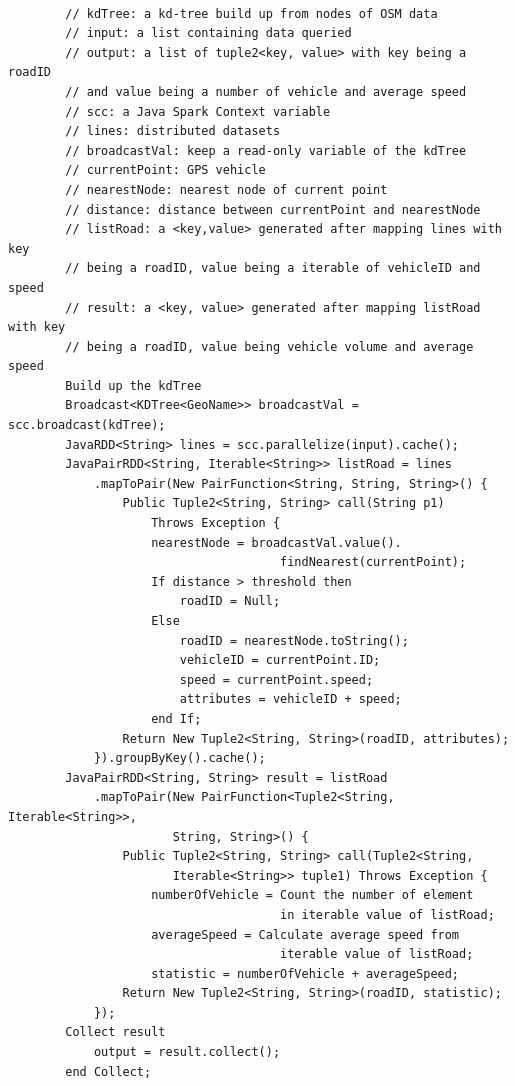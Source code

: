 \documentclass{sig-alternate-05-2015}
\begin{document}
\begin{verbatim}
		
		// kdTree: a kd-tree build up from nodes of OSM data
		// input: a list containing data queried
		// output: a list of tuple2<key, value> with key being a roadID 
		// and value being a number of vehicle and average speed
		// scc: a Java Spark Context variable
		// lines: distributed datasets
		// broadcastVal: keep a read-only variable of the kdTree
		// currentPoint: GPS vehicle 
		// nearestNode: nearest node of current point
		// distance: distance between currentPoint and nearestNode
		// listRoad: a <key,value> generated after mapping lines with key
		// being a roadID, value being a iterable of vehicleID and speed
		// result: a <key, value> generated after mapping listRoad with key 
		// being a roadID, value being vehicle volume and average speed
		Build up the kdTree
		Broadcast<KDTree<GeoName>> broadcastVal = scc.broadcast(kdTree);
		JavaRDD<String> lines = scc.parallelize(input).cache();
		JavaPairRDD<String, Iterable<String>> listRoad = lines
		    .mapToPair(New PairFunction<String, String, String>() {
		        Public Tuple2<String, String> call(String p1) 
		            Throws Exception {
		            nearestNode = broadcastVal.value().
		                              findNearest(currentPoint);	
		            If distance > threshold then
		                roadID = Null;
		            Else 
		                roadID = nearestNode.toString();
		                vehicleID = currentPoint.ID;
		                speed = currentPoint.speed;
		                attributes = vehicleID + speed;
		            end If;
		        Return New Tuple2<String, String>(roadID, attributes);
		    }).groupByKey().cache();
		JavaPairRDD<String, String> result = listRoad
		    .mapToPair(New PairFunction<Tuple2<String, Iterable<String>>, 
		               String, String>() {
		        Public Tuple2<String, String> call(Tuple2<String,
		               Iterable<String>> tuple1) Throws Exception {
		            numberOfVehicle = Count the number of element
		                              in iterable value of listRoad;
		            averageSpeed = Calculate average speed from
		                              iterable value of listRoad;
		            statistic = numberOfVehicle + averageSpeed;
		        Return New Tuple2<String, String>(roadID, statistic);
		    });
		Collect result
		    output = result.collect();
		end Collect;

\end{verbatim}
%
\noindent
\end{document}
